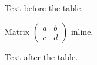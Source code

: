 \documentclass[12pt]{article}
\begin{document}
Text before the table.

Matrix $\left(\begin{array}{cc}a & b\\c & d\end{array}\right)$ inline.

Text after the table.
\end{document}
